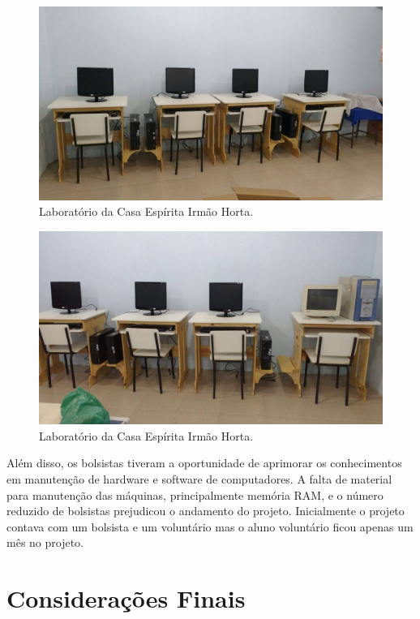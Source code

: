 \documentclass[
	12pt,				%
	openright,			%
	oneside,			%
	a4paper,			%
	english,			%
	spanish,			%
	brazil,				%
	]{abntex2}
\begin{document}
\begin{figure}[H]
 		\centering
 		\includegraphics[scale=0.3,angle=0]{figuras/CasaEspirita3.jpg}
 		\caption{Laboratório da Casa Espírita Irmão Horta.}  \label{fig:CasaEspirita3} 
 		\end{figure} 

\begin{figure}[H]
 		\centering
 		\includegraphics[scale=0.3,angle=0]{figuras/CasaEspirita4.jpg}
 		\caption{Laboratório da Casa Espírita Irmão Horta.}  \label{fig:CasaEspirita4} 
 		\end{figure} 

Além disso, os bolsistas tiveram a oportunidade de aprimorar os conhecimentos em manutenção de hardware e software de computadores.  
A falta de material para manutenção das máquinas, principalmente memória RAM, e o número reduzido de bolsistas prejudicou o andamento do projeto. Inicialmente o projeto contava com um bolsista e um voluntário mas o aluno voluntário ficou apenas um mês no projeto.  

\chapter{Considerações Finais}
\end{document}
